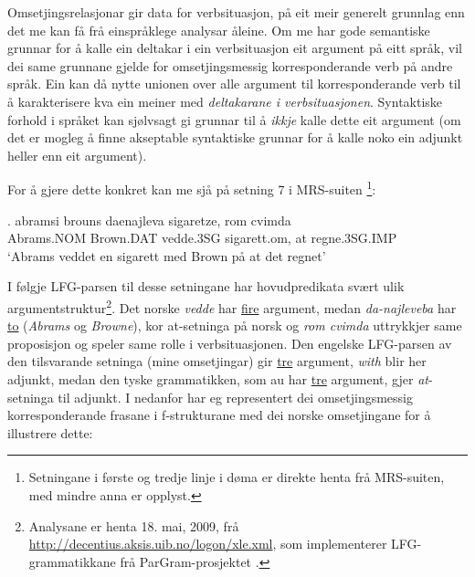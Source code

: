 \documentclass[11pt,a4paper,oneside,draft]{book}
\begin{document}
Omsetjingsrelasjonar gir data for verbsituasjon, på eit meir generelt
grunnlag enn det me kan få frå einspråklege analysar åleine. Om me har
gode semantiske grunnar for å kalle ein deltakar i ein verbsituasjon
eit argument på eitt språk, vil dei same grunnane gjelde for
omsetjingsmessig korresponderande verb på andre språk. Ein kan då
nytte unionen over alle argument til korresponderande verb til å
karakterisere kva ein meiner med \emph{deltakarane i verbsituasjonen}. Syntaktiske forhold i språket kan sjølvsagt gi
grunnar til å \emph{ikkje} kalle dette eit argument (om det er mogleg å
finne akseptable syntaktiske grunnar for å kalle noko ein adjunkt
heller enn eit argument).
 
For å gjere dette konkret kan me sjå på setning 7 i MRS-suiten
\citep{mrs-suite}\footnote{Setningane i første og tredje linje i døma er direkte henta frå
MRS-suiten, med mindre anna er opplyst. }:

\exg.  abramsi brouns       daenajleva sigaretze, rom cvimda \\
      Abrams.NOM Brown.DAT vedde.3SG sigarett.om, at  regne.3SG.IMP \\
     `Abrams veddet en sigarett med Brown på at det regnet' 

I følgje LFG-parsen til desse setningane har hovudpredikata svært ulik
argumentstruktur\footnote{Analysane er henta 18. mai, 2009, frå
        \href{http://decentius.aksis.uib.no/logon/xle.xml}{http://decentius.aksis.uib.no/logon/xle.xml}, som implementerer
        LFG-grammatikkane frå ParGram-prosjektet \citep{butt2002pgp}. }. Det norske \emph{vedde} har \underline{fire} argument, medan
\emph{da-najleveba} har \underline{to} (\emph{Abrams} og \emph{Browne}), kor at-setninga på
norsk og \emph{rom cvimda} uttrykkjer same proposisjon og speler same rolle
i verbsituasjonen. Den engelske LFG-parsen av den tilsvarande setninga
(mine omsetjingar) gir \underline{tre} argument, \emph{with} blir her adjunkt, medan
den tyske grammatikken, som au har \underline{tre} argument, gjer \emph{at}-setninga
til adjunkt. I \Next nedanfor har eg representert dei omsetjingsmessig
korresponderande frasane i f-strukturane med dei norske omsetjingane
for å illustrere dette:
\end{document}
